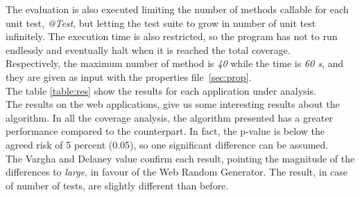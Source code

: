 The evaluation is also executed limiting the number of methods callable for each unit test, \emph{@Test}, but letting the test suite to grow in number of unit test infinitely.
The execution time is also restricted, so the program has not to run endlessly and eventually halt when it is reached the total coverage.\\
Respectively, the maximum number of method is \emph{40} while the time is \emph{60 s}, and they are given as input with the properties file~\ref{sec:prop}.\\
The table \ref{table:res} show the results for each application under analysis.\\
The results on the web applications, give us some interesting results about the algorithm.
In all the coverage analysis, the algorithm presented has a greater performance compared to the counterpart.
In fact, the p-value is below the agreed risk of 5 percent (0.05), so one significant difference can be assumed.\\
The Vargha and Delaney value confirm each result, pointing the magnitude of the differences to \emph{large}, in favour of the Web Random Generator.
The result, in case of number of tests, are slightly different than before.
\begin{figure}[H]
	\centering
	
	
\end{figure}

